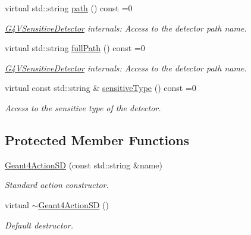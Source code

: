 \begin{DoxyCompactItemize}
virtual std::string \hyperlink{class_d_d4hep_1_1_simulation_1_1_geant4_action_s_d_a8d3333538a535ac963931173f15acfeb}{path} () const =0
\begin{DoxyCompactList}\small\item\em \hyperlink{class_g4_v_sensitive_detector}{G4VSensitiveDetector} internals: Access to the detector path name. \item\end{DoxyCompactList}\item 
virtual std::string \hyperlink{class_d_d4hep_1_1_simulation_1_1_geant4_action_s_d_afaba405dfb4c663ba2403ad4558d9956}{fullPath} () const =0
\begin{DoxyCompactList}\small\item\em \hyperlink{class_g4_v_sensitive_detector}{G4VSensitiveDetector} internals: Access to the detector path name. \item\end{DoxyCompactList}\item 
virtual const std::string \& \hyperlink{class_d_d4hep_1_1_simulation_1_1_geant4_action_s_d_ad2aec470fc9632ab3082b51b16a75c00}{sensitiveType} () const =0
\begin{DoxyCompactList}\small\item\em Access to the sensitive type of the detector. \item\end{DoxyCompactList}\end{DoxyCompactItemize}
\subsection*{Protected Member Functions}
\begin{DoxyCompactItemize}
\item 
\hyperlink{class_d_d4hep_1_1_simulation_1_1_geant4_action_s_d_ad09cff29caa01d794981f342c0b1632e}{Geant4ActionSD} (const std::string \&name)
\begin{DoxyCompactList}\small\item\em Standard action constructor. \item\end{DoxyCompactList}\item 
virtual \hyperlink{class_d_d4hep_1_1_simulation_1_1_geant4_action_s_d_a535bbf839314d7cdaf37c42712ea96b6}{$\sim$Geant4ActionSD} ()
\begin{DoxyCompactList}\small\item\em Default destructor. \item\end{DoxyCompactList}\end{DoxyCompactItemize}


